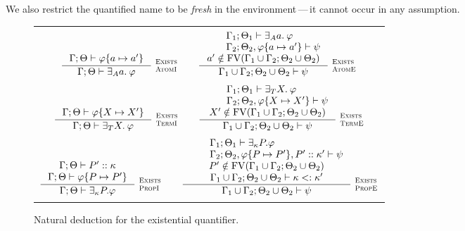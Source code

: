 \documentclass[english, mgr]{iithesis}
\renewcommand{\it}[1]{\textit{#1}}
\newcommand{\scbrk}[2]{\myatop{\textsc{#1}}{\textsc{#2}}}
\newcommand{\mdash}{\,---\,}
\def\-{{\mdash}}
\begin{document}
We also restrict the quantified name to be \it{fresh} in the environment\-it cannot occur in any assumption.
\begin{figure}[htbp]
  \centering
  \begin{tabularx}{\textwidth}{|C|}
  \hline \\ $
  \inference{
    \jgmnt[\cEnv;\Theta]{\formphi \{\atomv \mapsto \atomv'\}}
    }{
    \jgmnt[\cEnv;\Theta]{\fExistsAtom{\atomv}\formphi}
  }\:\scbrk{Exists}{AtomI}
  \qquad
  \inference{
    \qquad \jgmnt[\cEnv_1;\Theta_1]{\fExistsAtom{\atomv}\formphi} \hfill \\
    \qquad \jgmnt[\cEnv_2;\Theta_2,\formphi \{\atomv \mapsto \atomv'\}]{\psi} \hfill \\
    \atomv' \notin \fv[\cEnv_1 \cup \cEnv_2;\Theta_2 \cup \Theta_2]
    }{
    \jgmnt[\cEnv_1 \cup \cEnv_2;\Theta_2 \cup \Theta_2]{\psi}
  }\:\scbrk{Exists}{AtomE}
  $ \\ \\ $
  \inference{
    \jgmnt[\cEnv;\Theta]{\formphi \{\termv \mapsto \termv'\}}
    }{
    \jgmnt[\cEnv;\Theta]{\fExistsTerm{\termv}\formphi}
  }\:\scbrk{Exists}{TermI}
  \qquad
  \inference{
    \qquad \jgmnt[\cEnv_1;\Theta_1]{\fExistsTerm{\termv}\formphi} \hfill \\
    \qquad \jgmnt[\cEnv_2;\Theta_2,\formphi \{\termv \mapsto \termv'\}]{\psi} \hfill \\
    \termv' \notin \fv[\cEnv_1 \cup \cEnv_2;\Theta_2 \cup \Theta_2]
    }{
    \jgmnt[\cEnv_1 \cup \cEnv_2;\Theta_2 \cup \Theta_2]{\psi}
  }\:\scbrk{Exists}{TermE}
  $ \\ \\ $
  \inference{
    \jgmnt[\cEnv;\Theta]{\propv' \ofkind \kind}
    \\
    \jgmnt[\cEnv;\Theta]{\formphi \{\propv \mapsto \propv'\}}
    }{
    \jgmnt[\cEnv;\Theta]{\fExistsProp{\propv}{\kind}\formphi}
  }\:\scbrk{Exists}{PropI}
  \qquad
  \inference{
    \qquad \jgmnt[\cEnv_1;\Theta_1]{\fExistsProp{\propv}{\kind}\formphi} \hfill \\
    \qquad \jgmnt[\cEnv_2;\Theta_2,\formphi \{\propv \mapsto \propv'\}, \propv' \ofkind \kind']{\psi} \hfill \\
    \propv' \notin \fv[\cEnv_1 \cup \cEnv_2;\Theta_2 \cup \Theta_2] \\
    \jgmnt[\cEnv_1 \cup \cEnv_2;\Theta_2 \cup \Theta_2]{\kind \subkind \kind'}
  }{
      \jgmnt[\cEnv_1 \cup \cEnv_2;\Theta_2 \cup \Theta_2]{\psi}
  }\:\scbrk{Exists}{PropE}
  $ \\ \\ \hline
  \end{tabularx}
  \caption{Natural deduction for the existential quantifier.}
  \label{fig:quantifiers}
\end{figure}
\end{document}
